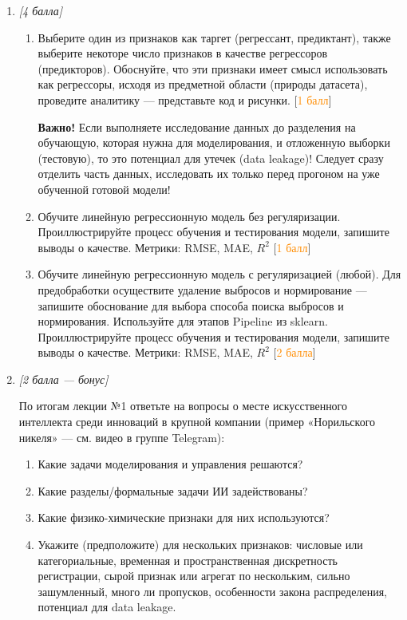 \begin{enumerate}[label=\textbf{Task \arabic*:}, leftmargin=*]
\item \textit{[4 балла]}

\begin{enumerate}[label=\arabic*.]
    \item Выберите один из признаков как таргет (регрессант, предиктант), также выберите некоторе число признаков в качестве регрессоров (предикторов). Обоснуйте, что эти признаки имеет смысл использовать как регрессоры, исходя из предметной области (природы датасета), проведите аналитику --- представьте код и рисунки. [\textcolor{DarkOrange}{1 балл}]

    \textbf{Важно!} Если выполняете исследование данных до разделения на обучающую, которая нужна для моделирования, и отложенную выборки (тестовую), то это потенциал для утечек (data leakage)! Следует сразу отделить часть данных, исследовать их только перед прогоном на уже обученной готовой модели!

    \item Обучите линейную регрессионную модель без регуляризации. Проиллюстрируйте процесс обучения и тестирования модели, запишите выводы о качестве. Метрики: RMSE, MAE, $R^{2}$ [\textcolor{DarkOrange}{1 балл}]

    \item Обучите линейную регрессионную модель с регуляризацией (любой). Для предобработки осуществите удаление выбросов и нормирование --- запишите обоснование для выбора способа поиска выбросов и нормирования. Используйте для этапов Pipeline из sklearn. Проиллюстрируйте процесс обучения и тестирования модели, запишите выводы о качестве. Метрики: RMSE, MAE, $R^{2}$ [\textcolor{DarkOrange}{2 балла}]
\end{enumerate}

\item \textit{[2 балла --- бонус]}

По итогам лекции №1 ответьте на вопросы о месте искусственного интеллекта среди инноваций в крупной компании (пример «Норильского никеля» --- см. видео в группе Telegram):

\begin{enumerate}[label=\arabic*.]
    \item Какие задачи моделирования и управления решаются?
    \item Какие разделы/формальные задачи ИИ задействованы?
    \item Какие физико-химические признаки для них используются?
    \item Укажите (предположите) для нескольких признаков: числовые или категориальные, временная и пространственная дискретность регистрации, сырой признак или агрегат по нескольким, сильно зашумленный, много ли пропусков, особенности закона распределения, потенциал для data leakage.
\end{enumerate}


\end{enumerate}
